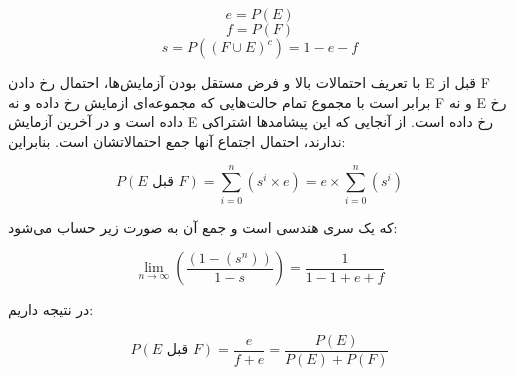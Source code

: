 \problem{}
\[ e = P(E) \]
\[ f = P(F) \]
\[ s = P((F \cup E)^{c}) = 1 - e - f \]

با تعریف احتمالات بالا و فرض مستقل بودن آزمایش‌ها، احتمال رخ دادن E قبل از F برابر است با مجموع تمام حالت‌هایی که مجموعه‌ای ازمایش رخ داده و نه F و نه E رخ داده است و در آخرین آزمایش E رخ داده است. از آنجایی که این پیشامد‌ها اشتراکی ندارند، احتمال اجتماع آنها جمع احتمالاتشان است. بنابراین:

\[ P(E \text{ قبل } F) = \sum_{i=0}^{n} (s^i \times e) = e \times \sum_{i=0}^{n} (s^i) \]

که یک سری هندسی است و جمع آن به صورت زیر حساب می‌شود:

\[ \lim_{n \to \infty} \left( \frac{(1 - (s^n))}{1 - s} \right) = \frac{1}{1 - 1 + e + f} \]

در نتیجه داریم:

\[ P(E \text{ قبل } F) = \frac{e}{f+e} = \frac{P(E)}{P(E)+P(F)} \]
